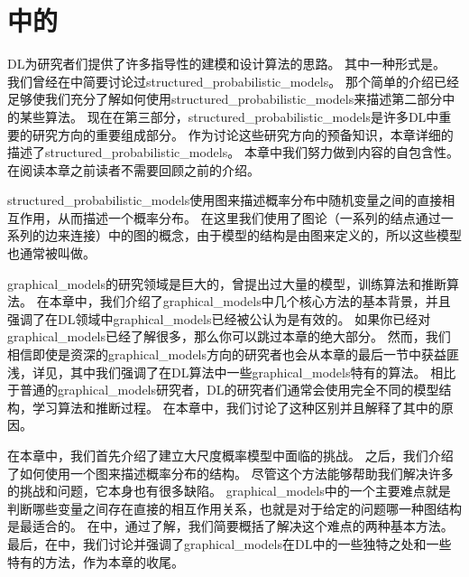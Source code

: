 \chapter{中的}
\label{chap:structured_probabilistic_models_for_deep_learning}


\gls{DL}为研究者们提供了许多指导性的建模和设计算法的思路。
其中一种形式是。
我们曾经在中简要讨论过\gls{structured_probabilistic_models}。
那个简单的介绍已经足够使我们充分了解如何使用\gls{structured_probabilistic_models}来描述第二部分中的某些算法。
现在在第三部分，\gls{structured_probabilistic_models}是许多\gls{DL}中重要的研究方向的重要组成部分。
作为讨论这些研究方向的预备知识，本章详细的描述了\gls{structured_probabilistic_models}。
本章中我们努力做到内容的自包含性。
在阅读本章之前读者不需要回顾之前的介绍。


\gls{structured_probabilistic_models}使用图来描述概率分布中随机变量之间的直接相互作用，从而描述一个概率分布。
在这里我们使用了图论（一系列的结点通过一系列的边来连接）中的图的概念，由于模型的结构是由图来定义的，所以这些模型也通常被叫做。


\gls{graphical_models}的研究领域是巨大的，曾提出过大量的模型，训练算法和推断算法。
在本章中，我们介绍了\gls{graphical_models}中几个核心方法的基本背景，并且强调了在\gls{DL}领域中\gls{graphical_models}已经被公认为是有效的。
如果你已经对\gls{graphical_models}已经了解很多，那么你可以跳过本章的绝大部分。
然而，我们相信即使是资深的\gls{graphical_models}方向的研究者也会从本章的最后一节中获益匪浅，详见，其中我们强调了在\gls{DL}算法中一些\gls{graphical_models}特有的算法。
相比于普通的\gls{graphical_models}研究者，\gls{DL}的研究者们通常会使用完全不同的模型结构，学习算法和推断过程。
在本章中，我们讨论了这种区别并且解释了其中的原因。


在本章中，我们首先介绍了建立大尺度概率模型中面临的挑战。
之后，我们介绍了如何使用一个图来描述概率分布的结构。
尽管这个方法能够帮助我们解决许多的挑战和问题，它本身也有很多缺陷。
\gls{graphical_models}中的一个主要难点就是判断哪些变量之间存在直接的相互作用关系，也就是对于给定的问题哪一种图结构是最适合的。
在中，通过了解，我们简要概括了解决这个难点的两种基本方法。
最后，在中，我们讨论并强调了\gls{graphical_models}在\gls{DL}中的一些独特之处和一些特有的方法，作为本章的收尾。



